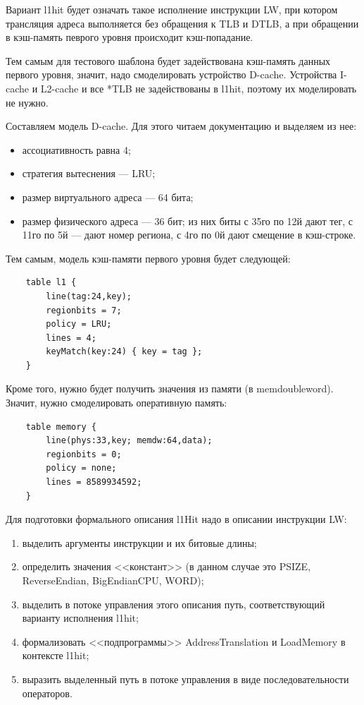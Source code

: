 Вариант l1hit будет означать такое исполнение инструкции LW, при котором трансляция адреса выполняется без обращения к TLB и DTLB, а при обращении в кэш-память певрого уровня происходит кэш-попадание.

Тем самым для тестового шаблона будет задействована кэш-память данных первого уровня, значит, надо смоделировать устройство D-cache. Устройства I-cache и L2-cache и все *TLB не задействованы в l1hit, поэтому их моделировать не нужно.

Составляем модель D-cache. Для этого читаем документацию и выделяем из нее:
\begin{itemize}
  \item ассоциативность равна 4;
  \item стратегия вытеснения --- LRU;
  \item размер виртуального адреса --- 64 бита;
  \item размер физического адреса --- 36 бит; из них биты с 35го по 12й дают тег, с 11го по 5й --- дают номер региона, с 4го по 0й дают смещение в кэш-строке.
\end{itemize}

Тем самым, модель кэш-памяти первого уровня будет следующей:
\begin{verbatim}
    table l1 {
        line(tag:24,key);
        regionbits = 7;
        policy = LRU;
        lines = 4;
        keyMatch(key:24) { key = tag };
    }
\end{verbatim}

Кроме того, нужно будет получить значения из памяти (в memdoubleword). Значит, нужно смоделировать оперативную память:
\begin{verbatim}
    table memory {
        line(phys:33,key; memdw:64,data);
        regionbits = 0;
        policy = none;
        lines = 8589934592;
    }
\end{verbatim}

Для подготовки формального описания l1Hit надо в описании инструкции LW:
\begin{enumerate}
  \item выделить аргументы инструкции и их битовые длины;
  \item определить значения <<констант>> (в данном случае это PSIZE,\\ ReverseEndian, BigEndianCPU, WORD);
  \item выделить в потоке управления этого описания путь, соответствующий варианту исполнения l1hit;
  \item формализовать <<подпрограммы>> AddressTranslation и LoadMemory в контексте l1hit;
  \item выразить выделенный путь в потоке управления в виде последовательности операторов.
\end{enumerate}

